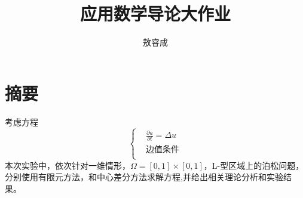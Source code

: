 \documentclass[12pt]{ctexart}
\begin{document}
	
\author{敖睿成}
\title{应用数学导论大作业}\date{}
\maketitle

\section{摘要}
考虑方程
$$\left\{
\begin{aligned}
&\frac{\partial u}{\partial t} = \Delta u\\
&\mbox{边值条件} \\
\end{aligned}
\right.$$
本次实验中，依次针对一维情形，$ \Omega = [0,1]\times [0,1]$，L-型区域上的泊松问题，分别使用有限元方法，和中心差分方法求解方程,并给出相关理论分析和实验结果。
\end{document}
